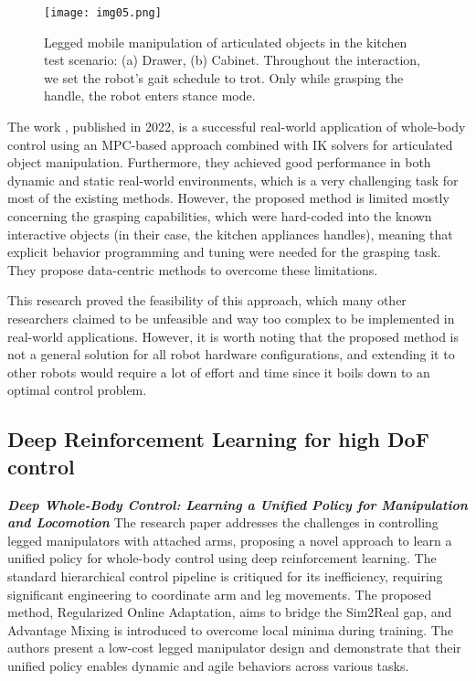 \begin{figure}[ht]
	\centering
	\texttt{[image: img05.png]}
	\captionsetup{width=1\linewidth}
	\caption{Legged mobile manipulation of articulated objects in the kitchen test scenario:
		(a) Drawer, (b) Cabinet. Throughout the interaction, we set the robot's gait schedule
		to trot. Only while grasping the handle, the robot enters stance mode.
		\cite{mittal2022articulated}}
	\label{fig:img05}
\end{figure}


The work \cite{mittal2022articulated}, published in 2022, is a successful real-world application
of whole-body control using an MPC-based approach
combined with IK solvers for articulated object manipulation.
Furthermore, they achieved good performance in both dynamic
and static real-world environments, which is a very challenging task for most of the
existing methods. However, the proposed method is limited mostly concerning the grasping
capabilities, which were hard-coded into the known interactive objects (in their case,
the kitchen appliances handles), meaning that explicit behavior programming and tuning were
needed for the grasping task. They propose data-centric methods to overcome these limitations.

This research proved the feasibility of this approach, which many other researchers claimed
to be unfeasible and way too complex to be implemented in real-world applications. However,
it is worth noting that the proposed method is not a general solution for all robot hardware
configurations, and extending it to other robots would require a lot of effort and time
since it boils down to an optimal control problem.

\subsection{Deep Reinforcement Learning for high DoF control}

\textbf{\textit{Deep Whole-Body Control: Learning a Unified Policy
		for Manipulation and Locomotion}} \quad
The research paper \cite{fu2022deeplegged} addresses the challenges in controlling legged
manipulators with attached arms, proposing a novel approach to learn a unified policy for
whole-body control using deep reinforcement learning. The standard hierarchical control pipeline
is critiqued for its inefficiency, requiring significant engineering to coordinate
arm and leg movements. The proposed method, Regularized Online Adaptation, aims to bridge the Sim2Real gap,
and Advantage Mixing is introduced to overcome local minima during training.
The authors present a low-cost legged manipulator design and demonstrate that their
unified policy enables dynamic and agile behaviors across various tasks.

